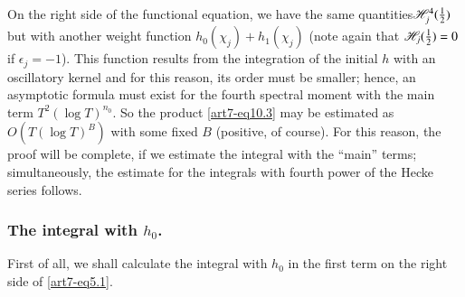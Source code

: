 On the right side of the functional equation, we have the same quantities\pageoriginale $\mathscr{H}^4_j (\frac{1}{2})$ but with another weight function $h_0 (\chi_j) + h_1 (\chi_j)$ (note again that $\mathscr{H}_j(\frac{1}{2}) =0$ if $\epsilon_j = -1$). This function results from the integration of the initial $h$ with an oscillatory kernel and for this reason, its order must be smaller; hence, an asymptotic formula must exist for the fourth spectral moment with the main term $T^2 (\log T)^{n_0}$. So the product \eqref{art7-eq10.3} may be estimated as $O(T (\log T)^B)$ with some fixed $B$ (positive, of course). For this reason, the proof will be complete, if we estimate the integral with the ``main'' terms; simultaneously, the estimate for the integrals with fourth power of the Hecke series follows. 


\setcounter{section}{2}
\subsubsection{The integral with {\boldmath$h_0$}.}\label{art7-subsubsec2.9.1}
First of all, we shall calculate the integral with $h_0$ in the first term on the right side of \eqref{art7-eq5.1}.

